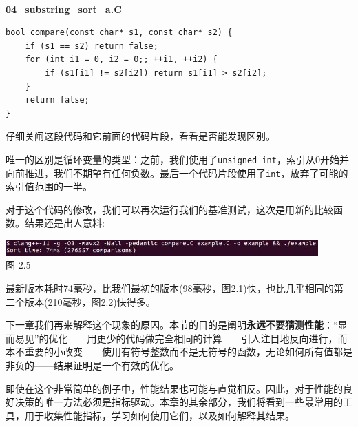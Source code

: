 \hspace*{\fill} \\ %
\noindent
\textbf{04\_substring\_sort\_a.C}
\begin{lstlisting}[style=styleCXX]
bool compare(const char* s1, const char* s2) {
	if (s1 == s2) return false;
	for (int i1 = 0, i2 = 0;; ++i1, ++i2) {
		if (s1[i1] != s2[i2]) return s1[i1] > s2[i2];
	}
	return false;
}
\end{lstlisting}

仔细关闸这段代码和它前面的代码片段，看看是否能发现区别。

唯一的区别是循环变量的类型：之前，我们使用了\texttt{unsigned int}，索引从0开始并向前推进，我们不期望有任何负数。最后一个代码片段使用了\texttt{int}，放弃了可能的索引值范围的一半。

对于这个代码的修改，我们可以再次运行我们的基准测试，这次是用新的比较函数。结果还是出人意料:

\begin{center}
\includegraphics[width=0.9\textwidth]{content/1/chapter2/images/5.jpg}\\
图 2.5
\end{center}

最新版本耗时74毫秒，比我们最初的版本(98毫秒，图2.1)快，也比几乎相同的第二个版本(210毫秒，图2.2)快得多。

下一章我们再来解释这个现象的原因。本节的目的是阐明\textbf{永远不要猜测性能}：“显而易见”的优化——用更少的代码做完全相同的计算——引人注目地反向进行，而本不重要的小改变——使用有符号整数而不是无符号的函数，无论如何所有值都是非负的——结果证明是一个有效的优化。

即使在这个非常简单的例子中，性能结果也可能与直觉相反。因此，对于性能的良好决策的唯一方法必须是指标驱动。本章的其余部分，我们将看到一些最常用的工具，用于收集性能指标，学习如何使用它们，以及如何解释其结果。
